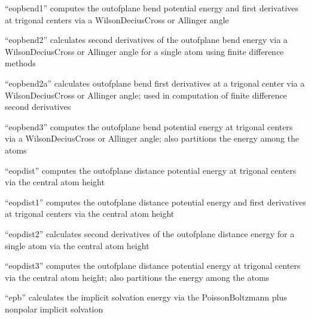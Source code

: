 \documentclass[letterpaper,11pt,english]{sphinxmanual}
\begin{document}

“eopbend1” computes the out\sphinxhyphen{}of\sphinxhyphen{}plane bend potential energy and
first derivatives at trigonal centers via a Wilson\sphinxhyphen{}Decius\sphinxhyphen{}Cross
or Allinger angle


“eopbend2” calculates second derivatives of the out\sphinxhyphen{}of\sphinxhyphen{}plane
bend energy via a Wilson\sphinxhyphen{}Decius\sphinxhyphen{}Cross or Allinger angle for
a single atom using finite difference methods


“eopbend2a” calculates out\sphinxhyphen{}of\sphinxhyphen{}plane bend first derivatives at
a trigonal center via a Wilson\sphinxhyphen{}Decius\sphinxhyphen{}Cross or Allinger angle;
used in computation of finite difference second derivatives


“eopbend3” computes the out\sphinxhyphen{}of\sphinxhyphen{}plane bend potential energy at
trigonal centers via a Wilson\sphinxhyphen{}Decius\sphinxhyphen{}Cross or Allinger angle;
also partitions the energy among the atoms


“eopdist” computes the out\sphinxhyphen{}of\sphinxhyphen{}plane distance potential
energy at trigonal centers via the central atom height


“eopdist1” computes the out\sphinxhyphen{}of\sphinxhyphen{}plane distance potential
energy and first derivatives at trigonal centers via
the central atom height


“eopdist2” calculates second derivatives of the out\sphinxhyphen{}of\sphinxhyphen{}plane
distance energy for a single atom via the central atom height


“eopdist3” computes the out\sphinxhyphen{}of\sphinxhyphen{}plane distance potential energy
at trigonal centers via the central atom height; also partitions
the energy among the atoms


“epb” calculates the implicit solvation energy via the
Poisson\sphinxhyphen{}Boltzmann plus nonpolar implicit solvation
\end{document}
